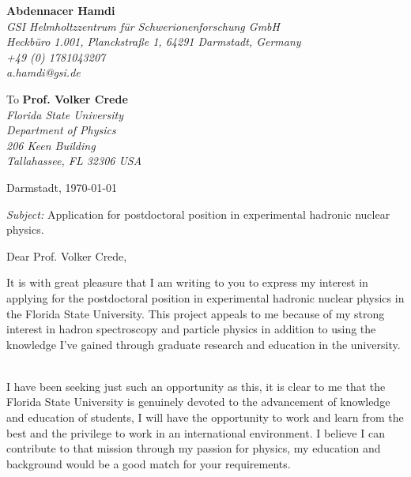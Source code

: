 \documentclass[11pt]{letter}
\begin{document}
 \sffamily
 \hfill
 \begin{flushleft}
 {\bfseries Abdennacer Hamdi}\\[.35ex]
 \small\itshape
 GSI Helmholtzzentrum f\"ur Schwerionenforschung GmbH\\
 Heckb\"uro 1.001, Planckstraße 1, 64291 Darmstadt, Germany\\[.35ex]
 +49 (0) 1781043207\\
 a.hamdi@gsi.de
 \end{flushleft}
 \begin{flushleft}
 To {\bfseries Prof. Volker Crede}\\[.35ex]
 \small\itshape
 Florida State University \\
 Department of Physics \\
 206 Keen Building \\
 Tallahassee, FL  32306  USA

 \end{flushleft}
 \hfill
 \begin{flushleft}
 Darmstadt, \today \\
 
 \end{flushleft}
\textit{Subject:} Application for postdoctoral position in experimental hadronic nuclear physics.\\
\par Dear Prof. Volker Crede, 
~\par It is with great pleasure that I am writing to you to express my interest in applying for the postdoctoral position in experimental hadronic nuclear physics in the Florida State University. This project appeals to me because of my strong interest in hadron spectroscopy and particle physics in addition to using the knowledge I’ve gained through graduate research and education in the university.
~\par I have been seeking just such an opportunity as this, it is clear to me that the Florida State University is genuinely devoted to the advancement of knowledge and education of students, I will have the opportunity to work and learn from the best and the privilege to work in an international environment. I believe I can contribute to that mission through my passion for physics, my education and background would be a good match for your requirements.
\end{document}
